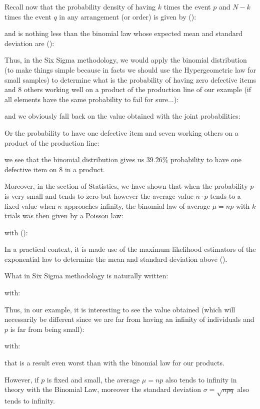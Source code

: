 Recall now that the probability density of having $k$ times the event $p$ and $N-k$ times the event $q$ in any arrangement (or order) is given by ():
	
and is nothing less than the binomial law whose expected mean and standard deviation are ():
	
Thus, in the Six Sigma methodology, we would apply the binomial distribution (to make things simple because in facts we should use the Hypergeometric law for small samples) to determine what is the probability of having zero defective items and $8$ others  working well on a product of the production line of our example (if all elements have the same probability to fail for sure...):
	
and we obviously fall back on the value obtained with the joint probabilities:
	
Or the probability to have one defective item and seven working others on a product of the production line:
	
we see that the binomial distribution gives us $39.26\%$ probability to have one defective item on $8$ in a product.	

Moreover, in the section of Statistics, we have shown that when the probability $p$ is very small and tends to zero but however the average value $n\cdot p$ tends to a fixed value when $n$ approaches infinity, the binomial law of average $\mu=np$ with $k$ trials was then given by a Poisson law:
	
with ():
	
	\begin{tcolorbox}[title=Remark,colframe=black,arc=10pt]
In a practical context, it is made use of the maximum likelihood estimators of the exponential law to determine the mean and standard deviation above ().
	\end{tcolorbox}
What in Six Sigma methodology is naturally written:
	
with:
	
Thus, in our example, it is interesting to see the value obtained (which will necessarily be different since we are far from having an infinity of individuals and $p$ is far from being small):
	
with:
	
that is a result even worst than with the binomial law for our products.

However, if $p$ is fixed and small, the average $\mu=np$ also tends to infinity in theory with the Binomial Law, moreover the standard deviation $\sigma=\sqrt{npq}$ also tends to infinity.

